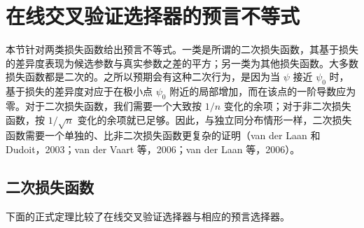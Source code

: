 \section{在线交叉验证选择器的预言不等式}

本节针对两类损失函数给出预言不等式。一类是所谓的二次损失函数，其基于损失的差异度表现为候选参数与真实参数之差的平方；另一类为其他损失函数。大多数损失函数都是二次的。之所以预期会有这种二次行为，是因为当 $\psi$ 接近 $\psi_0$ 时，基于损失的差异度对应于在极小点 $\psi_0$ 附近的局部增加，而在该点的一阶导数应为零。对于二次损失函数，我们需要一个大致按 $1/n$ 变化的余项；对于非二次损失函数，按 $1/\sqrt n$ 变化的余项就已足够。因此，与独立同分布情形一样，二次损失函数需要一个单独的、比非二次损失函数更复杂的证明（van der Laan 和 Dudoit，2003；van der Vaart 等，2006；van der Laan 等，2006）。

\subsection{二次损失函数}

下面的正式定理比较了在线交叉验证选择器与相应的预言选择器。

